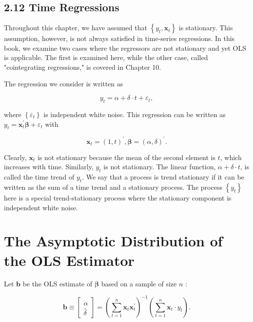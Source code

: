 \documentclass[10pt]{article}
\begin{document}
\subsection*{2.12 Time Regressions}
Throughout this chapter, we have assumed that $\left\{y_{t}, \mathbf{x}_{t}\right\}$ is stationary. This assumption, however, is not always satisfied in time-series regressions. In this book, we examine two cases where the regressors are not stationary and yet OLS is applicable. The first is examined here, while the other case, called "cointegrating regressions," is covered in Chapter 10.

The regression we consider is written as


\begin{equation*}
y_{t}=\alpha+\delta \cdot t+\varepsilon_{t}, \tag{2.12.1}
\end{equation*}


where $\left\{\varepsilon_{t}\right\}$ is independent white noise. This regression can be written as $y_{t}= \mathbf{x}_{t}^{\prime} \boldsymbol{\beta}+\varepsilon_{t}$ with


\begin{equation*}
\mathbf{x}_{t}=(1, t)^{\prime}, \boldsymbol{\beta}=(\alpha, \delta)^{\prime} . \tag{2.12.2}
\end{equation*}


Clearly, $\mathbf{x}_{t}$ is not stationary because the mean of the second element is $t$, which increases with time. Similarly, $y_{t}$ is not stationary. The linear function, $\alpha+\delta \cdot t$, is called the time trend of $y_{t}$. We say that a process is trend stationary if it can be written as the sum of a time trend and a stationary process. The process $\left\{y_{t}\right\}$ here is a special trend-stationary process where the stationary component is independent white noise.

\section*{The Asymptotic Distribution of the OLS Estimator}
Let $\mathbf{b}$ be the OLS estimate of $\boldsymbol{\beta}$ based on a sample of size $n$ :

\[
\mathbf{b} \equiv\left[\begin{array}{c}
\hat{\alpha}  \tag{2.12.3}\\
\hat{\delta}
\end{array}\right]=\left(\sum_{t=1}^{n} \mathbf{x}_{t} \mathbf{x}_{t}^{\prime}\right)^{-1}\left(\sum_{t=1}^{n} \mathbf{x}_{t} \cdot y_{t}\right) .
\]
\end{document}
